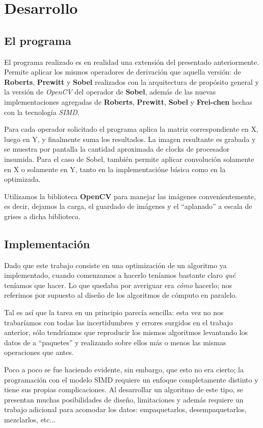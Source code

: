 \section{Desarrollo}

\subsection{El programa}

El programa realizado es en realidad una extensión del presentado anteriormente.
Permite aplicar los mismos operadores de derivación que aquella versión: de
\textbf{Roberts}, \textbf{Prewitt} y \textbf{Sobel} realizados con la arquitectura
de propósito general y la versión de \emph{OpenCV} del operador de \textbf{Sobel},
además de las nuevas implementaciones agregadas de \textbf{Roberts}, \textbf{Prewitt},
\textbf{Sobel} y \textbf{Frei-chen} hechas con la tecnología \emph{SIMD}.

Para cada operador solicitado el programa aplica la matriz correspondiente en X,
luego en Y, y finalmente suma los resultados. La imagen resultante es grabada y
se muestra por pantalla la cantidad aproximada de clocks de procesador insumida.
Para el caso de Sobel, también permite aplicar convolución solamente en X o
solamente en Y, tanto en la implementacióne básica como en la optimizada.

Utilizamos la biblioteca \textbf{OpenCV} para manejar las imágenes convenientemente,
es decir, dejamos la carga, el guardado de imágenes y el ``aplanado'' a escala
de grises a dicha biblioteca.


\subsection{Implementación}

Dado que este trabajo consiste en una optimización de un algoritmo ya implementado,
cuando comenzamos a hacerlo teníamos bastante claro \emph{qué} teníamos que hacer.
Lo que quedaba por averiguar era \emph{cómo} hacerlo; nos referimos por supuesto al
diseño de los algoritmos de cómputo en paralelo.

Tal es así que la tarea en un principio parecía sencilla: esta vez no nos trabaríamos
con todas las incertidumbres y errores surgidos en el trabajo anterior, sólo tendríamos
que reproducir los mismos algoritmos levantando los datos de a ``paquetes'' y
realizando sobre ellos más o menos las mismas operaciones que antes.

Poco a poco se fue haciendo evidente, sin embargo, que esto no era cierto; la
programación con el modelo SIMD requiere un enfoque completamente distinto y 
tiene sus propias complicaciones. Al desarrollar un algoritmo de este tipo, se 
presentan muchas posibilidades de diseño, limitaciones y además requiere un
trabajo adicional para acomodar los datos: empaquetarlos, desempaquetarlos,
mezclarlos, etc...

